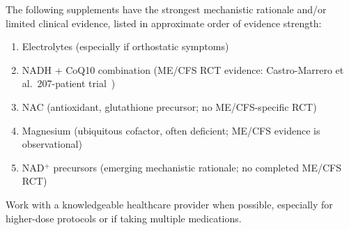 The following supplements have the strongest mechanistic rationale and/or limited clinical evidence, listed in approximate order of evidence strength:
\begin{enumerate}
    \item Electrolytes (especially if orthostatic symptoms)
    \item NADH + CoQ10 combination (ME/CFS RCT evidence: Castro-Marrero et al.\ 207-patient trial~\cite{CastroMarrero2021fatigue})
    \item NAC (antioxidant, glutathione precursor; no ME/CFS-specific RCT)
    \item Magnesium (ubiquitous cofactor, often deficient; ME/CFS evidence is observational)
    \item NAD$^+$ precursors (emerging mechanistic rationale; no completed ME/CFS RCT)
\end{enumerate}

Work with a knowledgeable healthcare provider when possible, especially for higher-dose protocols or if taking multiple medications.

